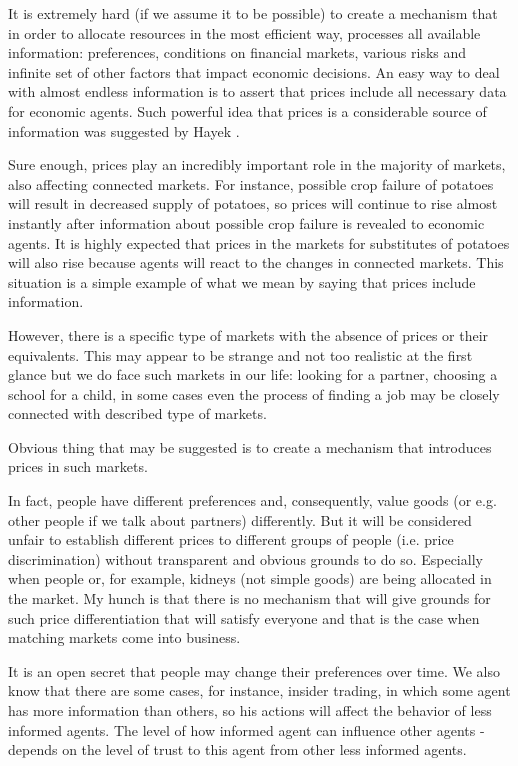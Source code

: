 \documentclass[a4paper]{article} %
\begin{document}
\hfill 
\break
It is extremely hard (if we assume it to be possible) to create a mechanism that in order to allocate resources in the most efficient way, processes all available information: preferences, conditions on financial markets, various risks and infinite set of other factors that impact economic decisions. An easy way to deal with almost endless information is to assert that prices include all necessary data for economic agents. Such powerful idea that prices is a considerable source of information was suggested by Hayek \cite{HayekPrices}.

\hfill 
\break
Sure enough, prices play an incredibly important role in the majority of markets, also affecting connected markets. For instance, possible crop failure of potatoes will result in decreased supply of potatoes, so prices will continue to rise almost instantly after information about possible crop failure is revealed to economic agents. It is highly expected that prices in the markets for substitutes of potatoes will also rise because agents will react to the changes in connected markets. This situation is a simple example of what we mean by saying that prices include information.

\hfill 
\break
However, there is a specific type of markets with the absence of prices or their equivalents. This may appear to be strange and not too realistic at the first glance but we do face such markets in our life: looking for a partner, choosing a school for a child, in some cases even the process of finding a job may be closely connected with described type of markets.

\hfill 
\break
Obvious thing that may be suggested is to create a mechanism that introduces prices in such markets. 

\hfill 
\break
In fact, people have different preferences and, consequently, value goods (or e.g. other people if we talk about partners) differently. But it will be considered unfair to establish different prices to different groups of people (i.e. price discrimination) without transparent and obvious grounds to do so. Especially when people or, for example, kidneys (not simple goods) are being allocated in the market. My hunch is that there is no mechanism that will give grounds for such price differentiation that will satisfy everyone and that is the case when matching markets come into business.


\hfill 
\break
It is an open secret that people may change their preferences over time. We also know that there are some cases, for instance, insider trading, in which some agent has more information than others, so his actions will affect the behavior of less informed agents. The level of how informed agent can influence other agents - depends on the level of trust to this agent from other less informed agents.
\end{document}
